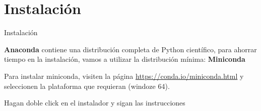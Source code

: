 \documentclass[10pt]{beamer}
\newcommand{\chref}[2]{
  \href{#1}{{\usebeamercolor[bg]{Feather}#2}}
}
\begin{document}
\section{Instalación}

\begin{frame}{Instalación}

  \begin{block}{}
    \textbf{Anaconda} contiene una distribución completa de Python científico,
    para ahorrar tiempo en la instalación, vamos a utilizar la distribución
    mínima: \textbf{Miniconda}
  \end{block}\pause

  \begin{block}{}
    Para instalar miniconda, visiten la página \chref{https://conda.io/miniconda.html}{https://conda.io/miniconda.html} y seleccionen la plataforma que requieran (windoze 64).

    Hagan doble click en el instalador y sigan las instrucciones
  \end{block}

\end{frame}
\end{document}
